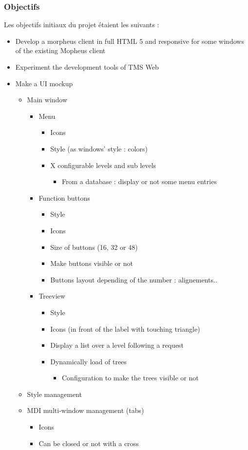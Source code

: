\documentclass[a4paper, 12pt, french]{article}
\newcommand{\bdot}{\item[\color{ssiYellow}\ding{108}]}
\newcommand{\bdotoutlined}{\item[\color{ssiYellow}\ding{109}]}
\newcommand{\bsquare}{\item[\color{ssiYellow}\ding{110}]}
\newcommand{\bsquareoutlined}{\item[\color{ssiYellow}\ding{111}]}
\newcommand{\bdiamond}{\item[\color{ssiYellow}\ding{117}]}
\begin{document}
				\subsubsection{Objectifs}
					Les objectifs initiaux du projet étaient les suivants :
	
					\begin{itemize}
						\bdot{Develop a morpheus client in full HTML 5 and responsive for some windows of the existing Mopheus client}
						\bdot{Experiment the development tools of TMS Web}
						\bdot{Make a UI mockup}
							\begin{itemize}
								\bdotoutlined{Main window}
									\begin{itemize}
										\bsquare{Menu}
											\begin{itemize}
												\bsquareoutlined{Icons}
												\bsquareoutlined{Style (as windows' style : colors)}
												\bsquareoutlined{X configurable levels and sub levels}
													\begin{itemize}
														\bdiamond{From a database : display or not some menu entries}
													\end{itemize}
											\end{itemize}
										\bsquare{Function buttons}
											\begin{itemize}
												\bsquareoutlined{Style}
												\bsquareoutlined{Icons}
												\bsquareoutlined{Size of buttons (16, 32 or 48)}
												\bsquareoutlined{Make buttons visible or not}
												\bsquareoutlined{Buttons layout depending of the number : alignements..}
											\end{itemize}
										\bsquare{Treeview}
											\begin{itemize}
												\bsquareoutlined{Style}
												\bsquareoutlined{Icons (in front of the label with touching triangle)}
												\bsquareoutlined{Display a list over a level following a request}
												\bsquareoutlined{Dynamically load of trees}
													\begin{itemize}
														\bdiamond{Configuration to make the trees visible or not}
													\end{itemize}
											\end{itemize}
									\end{itemize}
								\bdotoutlined{Style management}
								\bdotoutlined{MDI multi-window management (tabs)}
									\begin{itemize}
										\bsquare{Icons}
										\bsquare{Can be closed or not with a cross}

\end{itemize}
\end{itemize}
\end{itemize}
\end{document}
